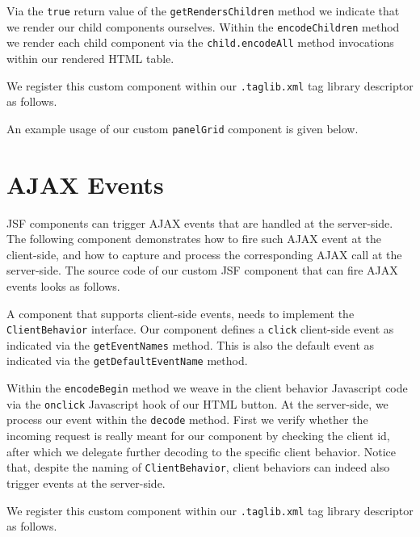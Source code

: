 Via the \texttt{true} return value of the \texttt{getRendersChildren} method we indicate that we render our child components ourselves.
Within the \texttt{encodeChildren} method we render each child component via the \texttt{child.encodeAll} method invocations within our rendered HTML table.

We register this custom component within our \texttt{.taglib.xml} tag library descriptor as follows.


An example usage of our custom \texttt{panelGrid} component is given below.



\section{AJAX Events}
JSF components can trigger AJAX events that are handled at the server-side.
The following component demonstrates how to fire such AJAX event at the client-side, and how to capture and process the corresponding AJAX call at the server-side.
The source code of our custom JSF component that can fire AJAX events looks as follows.

A component that supports client-side events, needs to implement the \texttt{ClientBehavior} interface.
Our component defines a \texttt{click} client-side event as indicated via the \texttt{getEventNames} method.
This is also the default event as indicated via the \texttt{getDefaultEventName} method.

Within the \texttt{encodeBegin} method we weave in the client behavior Javascript code via the \texttt{onclick} Javascript hook of our HTML button.
At the server-side, we process our event within the \texttt{decode} method.
First we verify whether the incoming request is really meant for our component by checking the client id, after which we delegate further decoding to the specific client behavior.
Notice that, despite the naming of \texttt{ClientBehavior}, client behaviors can indeed also trigger events at the server-side.

We register this custom component within our \texttt{.taglib.xml} tag library descriptor as follows.


